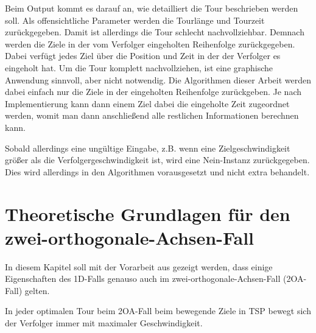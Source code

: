 \documentclass[german,version-2019-11]{uzl-thesis}
\begin{document}
Beim Output kommt es darauf an, wie detailliert die Tour beschrieben werden soll. Als offensichtliche Parameter werden die Tourlänge und Tourzeit zurückgegeben. Damit ist allerdings die Tour schlecht nachvollziehbar. Demnach werden die Ziele in der vom Verfolger eingeholten Reihenfolge zurückgegeben. Dabei verfügt jedes Ziel über die Position und Zeit in der der Verfolger es eingeholt hat. Um die Tour komplett nachvollziehen, ist eine graphische Anwendung sinnvoll, aber nicht notwendig. 
Die Algorithmen dieser Arbeit werden dabei einfach nur die Ziele in der eingeholten Reihenfolge zurückgeben. Je nach Implementierung kann dann einem Ziel dabei die eingeholte Zeit zugeordnet werden, womit man dann anschließend alle restlichen Informationen berechnen kann. 

Sobald allerdings eine ungültige Eingabe, z.B. wenn eine Zielgeschwindigkeit größer als die Verfolgergeschwindigkeit ist, wird eine \glqq Nein\grqq-Instanz zurückgegeben. Dies wird allerdings in den Algorithmen vorausgesetzt und nicht extra behandelt. 

\chapter{Theoretische Grundlagen für den zwei-orthogonale-Achsen-Fall}

In diesem Kapitel soll mit der Vorarbeit aus \cite{helvig} gezeigt werden, dass einige Eigenschaften des 1D-Falls genauso auch im zwei-orthogonale-Achsen-Fall (2OA-Fall) gelten.

\begin{lemma}
In jeder optimalen Tour beim 2OA-Fall beim bewegende Ziele in TSP bewegt sich der Verfolger immer mit maximaler Geschwindigkeit.
\end{lemma}
 
\end{document}
